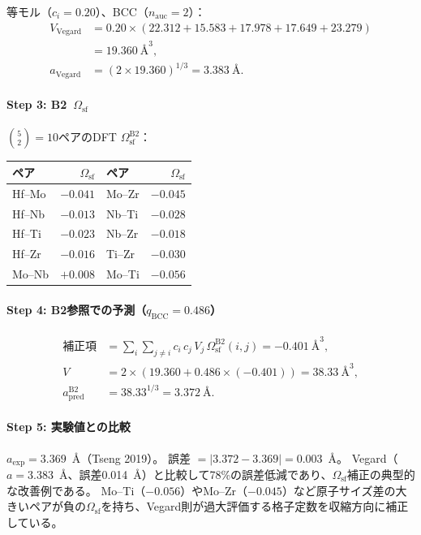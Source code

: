 \documentclass[5p,10pt]{elsarticle}
\begin{document}
等モル（$c_i = 0.20$）、BCC（$n_\text{auc} = 2$）：
\begin{align}
V_\text{Vegard} &= 0.20 \times (22.312 + 15.583 + 17.978 + 17.649 + 23.279) \nonumber \\
&= 19.360~\text{\AA}^3, \nonumber \\
a_\text{Vegard} &= (2 \times 19.360)^{1/3} = 3.383~\text{\AA}. \label{eq:ex_vegard_bcc}
\end{align}

\paragraph{Step 3: B2~$\Omega_\text{sf}$}

$\binom{5}{2} = 10$ペアのDFT $\Omega_\text{sf}^\text{B2}$：
\begin{center}
\footnotesize
\begin{tabular}{@{}lrlr@{}}
\toprule
ペア & $\Omega_\text{sf}$ & ペア & $\Omega_\text{sf}$ \\
\midrule
Hf--Mo & $-0.041$ & Mo--Zr & $-0.045$ \\
Hf--Nb & $-0.013$ & Nb--Ti & $-0.028$ \\
Hf--Ti & $-0.023$ & Nb--Zr & $-0.018$ \\
Hf--Zr & $-0.016$ & Ti--Zr & $-0.030$ \\
Mo--Nb & $+0.008$ & Mo--Ti & $-0.056$ \\
\bottomrule
\end{tabular}
\end{center}

\paragraph{Step 4: B2参照での予測（$q_\text{BCC} = 0.486$）}
\begin{align}
\text{補正項} &= \sum_i \sum_{j \ne i} c_i\,c_j\,V_j\,\Omega_\text{sf}^\text{B2}(i,j)
= -0.401~\text{\AA}^3, \nonumber \\
V &= 2 \times (19.360 + 0.486 \times (-0.401)) = 38.33~\text{\AA}^3, \nonumber \\
a_\text{pred}^{\text{B2}} &= 38.33^{1/3} = 3.372~\text{\AA}. \label{eq:ex_pred_bcc}
\end{align}

\paragraph{Step 5: 実験値との比較}

$a_\text{exp} = 3.369$~\AA{}（Tseng 2019）。
誤差 $= |3.372 - 3.369| = 0.003$~\AA。
Vegard（$a = 3.383$~\AA、誤差0.014~\AA）と比較して78\%の誤差低減であり、$\Omega_\text{sf}$補正の典型的な改善例である。
Mo--Ti（$-0.056$）やMo--Zr（$-0.045$）など原子サイズ差の大きいペアが負の$\Omega_\text{sf}$を持ち、Vegard則が過大評価する格子定数を収縮方向に補正している。
\end{document}
